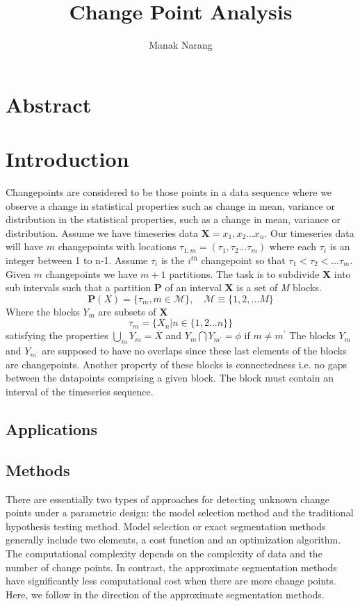 \documentclass{article}
\title{Change Point Analysis}
\author{Manak Narang}
\begin{document}
\maketitle
\section{Abstract}
\section{Introduction}
Changepoints are considered to be those points in a data sequence where we observe a change in statistical properties such as change in mean, variance or distribution in the statistical properties, such as a change in mean, variance or distribution. Assume we have timeseries data $\textbf{X} = x_{1},x_{2}...x_{n}$. Our timeseries data will have $m$ changepoints with locations $\tau_{1:m} = (\tau_{1},\tau_{2}...\tau_{m})$ where each $\tau_{i}$ is an integer between 1 to n-1. Assume $\tau_{i}$ is the $i^{th}$ changepoint so that $\tau_{1}<\tau_{2}<...\tau_{m}$. Given $m$ changepoints we have $m+1$ partitions. The task is to subdivide $\textbf{X}$ into sub intervals such that a partition \textbf{P} of an interval \textbf{X} is a set of \textit{M} blocks.
$$\textbf{P}(X) = \{\tau_{m},m\in\mathcal{M}\},\quad \mathcal{M} \equiv \{1,2,... M\}  $$
Where the blocks $Y_{m}$ are subsets of \textbf{X} $$ \tau_{m} = \{{X_{n}|n\in\{1,2...n\}}\}$$
satisfying the properties $\bigcup_{m} Y_{m} = X$ and $Y_{m} \bigcap Y_{m^{'}} = \phi$ if $m \neq m^{'}$
The blocks $Y_{m}$ and $Y_{m^{'}}$ are supposed to have no overlaps since these last elements of the blocks are changepoints. Another property of these blocks is connectedness i.e. no gaps between the datapoints comprising a given block. The block must contain an interval of the timeseries sequence. 
\subsection{Applications}
\subsection{Methods}
There are essentially two types of approaches for detecting unknown change points under a parametric design: the model selection method and the traditional hypothesis testing method. Model selection or exact segmentation methods generally include two elements, a cost function and an optimization algorithm. The computational complexity depends on the complexity of data and the number of change points. In contrast, the approximate segmentation methods have significantly less computational cost when there are more change points. Here, we follow in the direction of the approximate segmentation methods.
\end{document}
